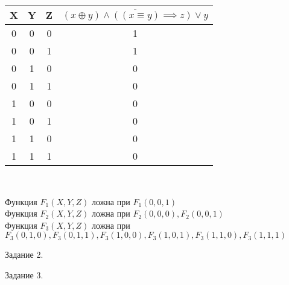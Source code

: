 \documentclass[a4paper,12pt]{report} %
\begin{document}
\begin{flushleft}
	\begin{center}
		\begin{tabular}{ | c | c | c | c |}
			\hline
			X & Y & Z & $\overline{(x \oplus y) \wedge ((x \equiv y) \implies z) \vee y}$ \\
			\hline
			0 & 0 & 0 & 1                                                                 \\
			\hline
			0 & 0 & 1 & 1                                                                 \\ 
			\hline
			0 & 1 & 0 & 0                                                                 \\
			\hline
			0 & 1 & 1 & 0                                                                 \\
			\hline
			1 & 0 & 0 & 0                                                                 \\
			\hline
			1 & 0 & 1 & 0                                                                 \\
			\hline
			1 & 1 & 0 & 0                                                                 \\
			\hline
			1 & 1 & 1 & 0                                                                 \\
			\hline
		\end{tabular} \\
	\end{center}
	
	Функция $F_1(X,Y,Z)$ ложна при $F_1(0,0,1)$\\
	Функция $F_2(X,Y,Z)$ ложна при $F_2(0,0,0), F_2(0,0,1)$\\
	Функция $F_3(X,Y,Z)$ ложна при $F_3(0,1,0), F_3(0,1,1), F_3(1,0,0), F_3(1,0,1), F_3(1,1,0), F_3(1,1,1)$\\
	
\end{flushleft}

\bigskip

\newpage
\begin{center}
	Задание  2.\\
\end{center}

\begin{flushleft}
	
	
\end{flushleft}

\bigskip


\begin{center}
	Задание 3.
\end{center}
\end{document}
